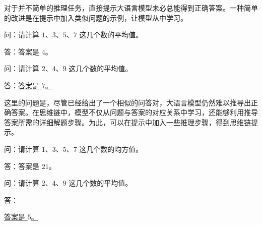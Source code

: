 对于并不简单的推理任务，直接提示大语言模型未必总能得到正确答案。一种简单的改进是在提示中加入类似问题的示例，让模型从中学习。

\vspace{0.5em}
\begin{tcolorbox}

\begingroup
\setlength{\leftskip}{2em}
\setlength{\rightskip}{2em}

问：请计算 $1$、$3$、$5$、$7$ 这几个数的平均值。

\vspace{0.3em}

答：答案是 $4$。

\vspace{0.7em}

问：请计算 $2$、$4$、$9$ 这几个数的平均值。

\vspace{0.3em}

答：\underline{答案是 $7$。}

\endgroup

\end{tcolorbox}
\vspace{0.5em}

这里的问题是，尽管已经给出了一个相似的问答对，大语言模型仍然难以推导出正确答案。在思维链中，模型不仅从问题与答案的对应关系中学习，还能够利用推导答案所需的详细解题步骤。为此，可以在提示中加入一些推理步骤，得到思维链提示。

\vspace{0.5em}
\begin{tcolorbox}

\begingroup
\setlength{\leftskip}{2em}
\setlength{\rightskip}{2em}

问：请计算 1、3、5、7 这几个数的均方值。

\vspace{0.3em}

答：答案是 $21$。

\vspace{0.7em}

问：请计算 $2$、$4$、$9$ 这几个数的平均值。

\vspace{0.3em}

答：\underline{}

\underline{答案是 $5$。}

\endgroup

\end{tcolorbox}
\vspace{0.5em}

